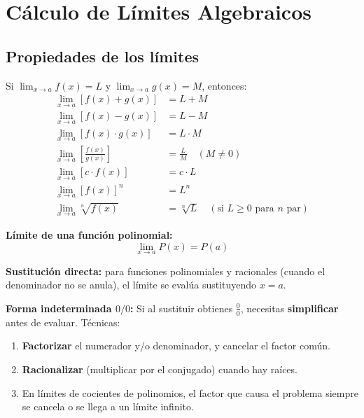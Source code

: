 \documentclass[12pt, letterpaper]{article}
\begin{document}
\newpage


\section{Cálculo de Límites Algebraicos}

\subsection{Propiedades de los límites}

\begin{cuadroteoria}
  Si $\lim_{x \to a} f(x) = L$ y $\lim_{x \to a} g(x) = M$, entonces:
  \begin{align*}
    \lim_{x \to a} [f(x) + g(x)]                  & = L + M                                                               \\
    \lim_{x \to a} [f(x) - g(x)]                  & = L - M                                                               \\
    \lim_{x \to a} [f(x) \cdot g(x)]              & = L \cdot M                                                           \\
    \lim_{x \to a} \left[\frac{f(x)}{g(x)}\right] & = \frac{L}{M} \quad (M \neq 0)                                        \\
    \lim_{x \to a} [c \cdot f(x)]                 & = c \cdot L                                                           \\
    \lim_{x \to a} [f(x)]^n                       & = L^n                                                                 \\
    \lim_{x \to a} \sqrt[n]{f(x)}                 & = \sqrt[n]{L} \quad (\text{si } L \geq 0 \text{ para } n \text{ par})
  \end{align*}

  \textbf{Límite de una función polinomial:}
  $$\lim_{x \to a} P(x) = P(a)$$

  \textbf{Sustitución directa:} para funciones polinomiales y racionales (cuando el denominador no se anula), el límite se evalúa sustituyendo $x = a$.
\end{cuadroteoria}

\begin{cuadroadvertencia}
  \textbf{Forma indeterminada $0/0$:} Si al sustituir obtienes $\frac{0}{0}$, necesitas \textbf{simplificar} antes de evaluar. Técnicas:
  \begin{enumerate}[leftmargin=*]
    \item \textbf{Factorizar} el numerador y/o denominador, y cancelar el factor común.
    \item \textbf{Racionalizar} (multiplicar por el conjugado) cuando hay raíces.
    \item En límites de cocientes de polinomios, el factor que causa el problema siempre se cancela o se llega a un límite infinito.
  \end{enumerate}
\end{cuadroadvertencia}
\end{document}
